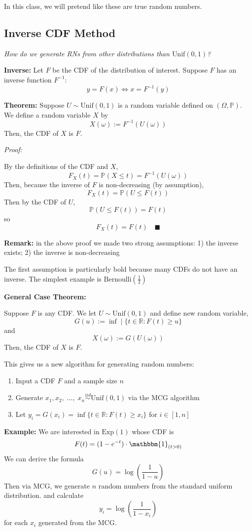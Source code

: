 \documentclass[12pt]{article}
\renewcommand{\P}{\mathbb{P}}
\newcommand{\R}{\mathbb{R}}
\newcommand{\qed}{\quad \blacksquare}
\newcommand{\ind}{\mathbbm{1}}
\newcommand{\ellipsis}{\; \dots, \;}
\begin{document}
In this class, we will pretend like these are true random numbers. 

\subsection*{Inverse CDF Method}
\emph{How do we generate RNs from other distributions than $\text{Unif}(0, 1)$?}

\textbf{Inverse:} Let $F$ be the CDF of the distribution of interest. Suppose $F$ has an inverse function $F^{-1}$:
\[y = F(x) \iff x = F^{-1}(y)\]

\textbf{Theorem:} Suppose $U \sim \text{Unif}(0, 1)$ is a random variable defined on $(\Omega, \P)$. We define a random variable $X$ by 
\[X(\omega) := F^{-1}(U(\omega))\]
Then, the CDF of $X$ is $F$. 

\emph{Proof:} 

By the definitions of the CDF and $X$, 
\[F_X(t) = \P(X \leq t) = F^{-1}(U(\omega))\]
Then, because the inverse of $F$ is non-decreasing (by assumption),
\[F_X(t) = \P(U \leq F(t))\]
Then by the CDF of $U$, 
\[\P(U \leq F(t)) = F(t)\]
so 
\[F_X(t) = F(t) \qed\]

\textbf{Remark:} in the above proof we made two strong assumptions: 1) the inverse exists; 2) the inverse is non-decreasing 

The first assumption is particularly bold because many CDFs do not have an inverse. The simplest example is $\text{Bernoulli}(\frac{1}{2})$

\textbf{General Case Theorem:} 

Suppose $F$ is any CDF. We let $U \sim \text{Unif}(0, 1)$ and define new random variable,
\[G(u) := \inf\; | \;\{t \in \R: F(t) \geq u\}\]
and 
\[X(\omega) := G(U(\omega))\]
Then, the CDF of $X$ is $F$. 

This gives us a new algorithm for generating random numbers:
\begin{enumerate}
    \item Input a CDF $F$ and a sample size $n$
    \item Generate $x_1, x_2, \ellipsis x_n \overset{iid}{\sim} \text{Unif}(0, 1)$ via the MCG algorithm
    \item Let $y_i = G(x_i) = \inf\{t \in \R : F(t) \geq x_i\}$ for $i \in [1, n]$
\end{enumerate}

\textbf{Example:} We are interested in $\text{Exp}(1)$ whose CDF is 
\[F(t) = (1 - e^{-t}) \cdot \ind_{(t > 0)} \]
We can derive the formula 
\[G(u) = \log\left(\frac{1}{1 - u}\right)\]
Then via MCG, we generate $n$ random numbers from the standard uniform distribution. and calculate
\[y_i = \log\left(\frac{1}{1 - x_i}\right)\] 
for each $x_i$ generated from the MCG. 
\end{document}
